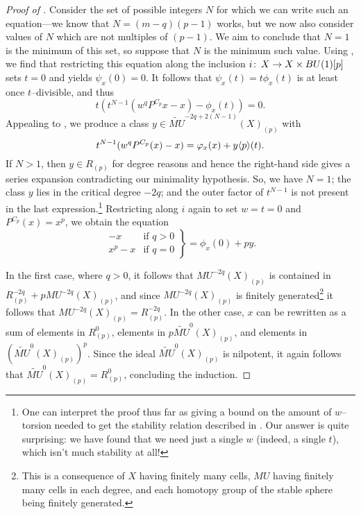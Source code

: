 \begin{proof}[{Proof of }]
Consider the set of possible integers \(N\) for which we can write such an equation---we know that \(N = (m-q)(p - 1)\) works, but we now also consider values of \(N\) which are not multiples of \((p - 1)\).  We aim to conclude that \(N = 1\) is the minimum of this set, so suppose that \(N\) is the minimum such value.  Using , we find that restricting this equation along the inclusion \(i\colon\thinspace X \to X \times BU(1)[p]\) sets \(t = 0\) and yields \(\psi_x(0) = 0\).  It follows that \(\psi_x(t) = t \phi_x(t)\) is at least once \(t\)--divisible, and thus \[t (t^{N-1}(w^q P^{C_p}x - x) - \phi_x(t)) = 0.\]  Appealing to , we produce a class \(y \in \widetilde{MU}^{-2q + 2(N-1)}(X)_{(p)}\) with \[t^{N-1}(w^q P^{C_p}(x) - x) = \varphi_x(x) + y \langle p\rangle(t).\]  If \(N > 1\), then \(y \in R_{(p)}\) for degree reasons and hence the right-hand side gives a series expansion contradicting our minimality hypothesis.  So, we have \(N = 1\); the class \(y\) lies in the critical degree \(-2q\); and the outer factor of \(t^{N-1}\) is not present in the last expression.\footnote{One can interpret the proof thus far as giving a bound on the amount of \(w\)--torsion needed to get the stability relation described in .  Our answer is quite surprising: we have found that we need just a single \(w\) (indeed, a single \(t\)), which isn't much stability at all!}  Restricting along \(i\) again to set \(w = t = 0\) and \(P^{C_p}(x) = x^p\), we obtain the equation \[\left. \begin{array}{rr} -x & \text{if \(q > 0\)} \\ x^p - x & \text{if \(q = 0\)} \end{array} \right\} = \phi_x(0) + py.\]

In the first case, where \(q > 0\), it follows that \(MU^{-2q}(X)_{(p)}\) is contained in \(R^{-2q}_{(p)} + pMU^{-2q}(X)_{(p)}\), and since \(MU^{-2q}(X)_{(p)}\) is finitely generated\footnote{This is a consequence of \(X\) having finitely many cells, \(MU\) having finitely many cells in each degree, and each homotopy group of the stable sphere being finitely generated.} it follows that \(MU^{-2q}(X)_{(p)} = R^{-2q}_{(p)}\).  In the other case, \(x\) can be rewritten as a sum of elements in \(R^{0}_{(p)}\), elements in \(p \widetilde{MU}^{0}(X)_{(p)}\), and elements in \((\widetilde{MU}^0(X)_{(p)})^p\).  Since the ideal \(\widetilde{MU}^0(X)_{(p)}\) is nilpotent, it again follows that \(\widetilde{MU}^0(X)_{(p)} = R^0_{(p)}\), concluding the induction.
\end{proof}

